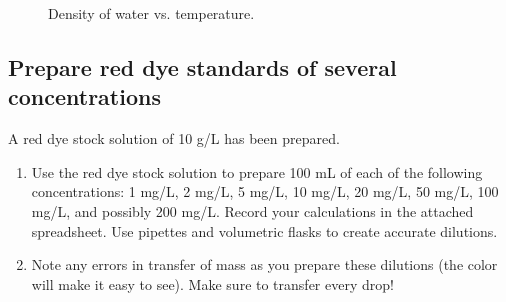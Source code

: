 \documentclass[letterpaper,10pt,english]{sphinxmanual}
\let\sphinxpxdimen\pdfpxdimen\else\newdimen\sphinxpxdimen
\begin{document}
%
\begin{sphinxVerbatim}[commandchars=\\\{\}]
  
  
  
   
 
\end{sphinxVerbatim}

\begin{figure}[htbp]
\centering
\capstart

\noindent\sphinxincludegraphics[width=300\sphinxpxdimen]{{Density_vs_T}.png}
\caption{Density of water vs. temperature.}\label{\detokenize{Laboratory_Measurements/Laboratory_Measurements:id2}}\label{\detokenize{Laboratory_Measurements/Laboratory_Measurements:figure-density-vs-t}}\end{figure}


\subsection{Prepare red dye standards of several concentrations}
\label{\detokenize{Laboratory_Measurements/Laboratory_Measurements:prepare-red-dye-standards-of-several-concentrations}}
A red dye stock solution of 10 g/L has been prepared.
\begin{enumerate}
\item {} 
Use the red dye stock solution to prepare 100 mL of each of the following concentrations: 1 mg/L, 2 mg/L, 5 mg/L, 10 mg/L, 20 mg/L, 50 mg/L, 100 mg/L, and possibly 200 mg/L.  Record your calculations in the attached spreadsheet. Use pipettes and volumetric flasks to create accurate dilutions.

\item {} 
Note any errors in transfer of mass as you prepare these dilutions (the color will make it easy to see). Make sure to transfer every drop!

\end{enumerate}
\end{document}
